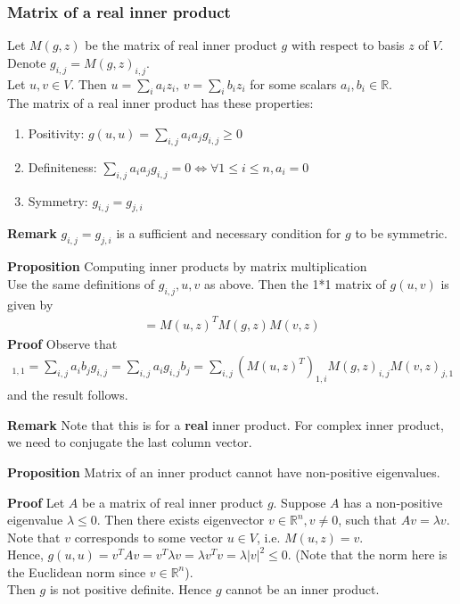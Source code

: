 \documentclass{article}
\begin{document}
\subsubsection{Matrix of a real inner product}
Let $M(g,z)$ be the matrix of real inner product $g$ with respect to basis $z$ of $V$. Denote $g_{i,j}=M(g,z)_{i,j}$.\\
Let $u,v\in V$. Then $u=\sum_i a_iz_i,\, v=\sum_i b_iz_i$ for some scalars $a_i,b_i\in \mathbb{R}$.\\
The matrix of a real inner product has these properties:
\begin{enumerate}
	\item Positivity: $g(u,u)=\sum_{i,j} a_ia_j g_{i,j}\geq 0$
	\item Definiteness: $\sum_{i,j} a_ia_j g_{i,j}=0 \iff \forall 1\leq i\leq n, a_i=0$
	\item Symmetry: $g_{i,j}=g_{j,i}$
\end{enumerate}
\textbf{Remark} $g_{i,j}=g_{j,i}$ is a sufficient and necessary condition for $g$ to be symmetric.

\textbf{Proposition} Computing inner products by matrix multiplication\\
Use the same definitions of $g_{i,j},u,v$ as above. Then the 1*1 matrix of $g(u,v)$ is given by
\begin{align*}
	[g(u,v)] = M(u,z)^TM(g,z)M(v,z)
\end{align*}
\textbf{Proof} Observe that 
\begin{align*}
	[g(u,v)]_{1,1} = \sum_{i,j}a_ib_j g_{i,j} = \sum_{i,j}a_ig_{i,j}b_j = \sum_{i,j}(M(u,z)^T)_{1,i} M(g,z)_{i,j} M(v,z)_{j,1}
\end{align*}
and the result follows.

\textbf{Remark} Note that this is for a \textbf{real} inner product. For complex inner product, we need to conjugate the last column vector.

\textbf{Proposition} Matrix of an inner product cannot have non-positive eigenvalues.

\textbf{Proof} Let $A$ be a matrix of real inner product $g$. Suppose $A$ has a non-positive eigenvalue $\lambda \leq 0$. Then there exists eigenvector $v\in \mathbb{R}^n, v\neq 0$, such that $Av=\lambda v$. Note that $v$ corresponds to some vector $u\in V$, i.e. $M(u, z)=v$.\\
Hence, $g(u,u)=v^TAv=v^T\lambda v=\lambda v^Tv = \lambda |v|^2 \leq 0$. (Note that the norm here is the Euclidean norm since $v\in \mathbb{R}^n$).\\
Then $g$ is not positive definite. Hence $g$ cannot be an inner product.
\end{document}
